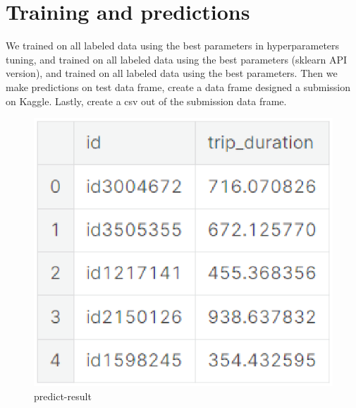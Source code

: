 \section{Training and predictions}
We trained on all labeled data using the best parameters in hyperparameters tuning, and trained on all labeled data using the best parameters (sklearn API version), and trained on all labeled data using the best parameters. Then we make predictions on test data frame, create a data frame designed a submission on Kaggle.
Lastly, create a csv out of the submission data frame.
\begin{figure}[h]
	\centering
	\includegraphics[scale=0.3]{predict_result.eps}
	\caption{predict-result}
\end{figure}



